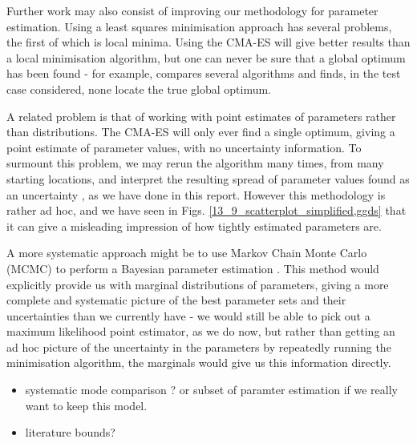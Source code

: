 \documentclass[10pt,journal]{./IEEE_latex_class/IEEEtran}
\begin{document}
Further work may also consist of improving our methodology for parameter estimation. Using a least squares minimisation approach has several problems, the first of which is local minima. Using the CMA-ES will give better results than a local minimisation algorithm, but one can never be sure that a global optimum has been found - for example, \cite{Algorithms2003} compares several algorithms and finds, in the test case considered, none locate the true global optimum.

 A related problem is that of working with point estimates of parameters rather than distributions. The CMA-ES will only ever find a single optimum, giving a point estimate of parameter values, with no uncertainty information. To surmount this problem, we may rerun the algorithm many times, from many starting locations, and interpret the resulting spread of parameter values found as an uncertainty \cite{Hu2015}, as we have done in this report. However this methodology is rather ad hoc, and we have seen in Figs. \ref{13_9_scatterplot_simplified,ggds} that it can give a misleading impression of how tightly estimated parameters are.






A more systematic approach might be to use Markov Chain Monte Carlo (MCMC) to perform a Bayesian parameter estimation \cite{Jitjareonchai2006,Andrieu2003}. This method would explicitly provide us with marginal distributions of parameters, giving a more complete and systematic picture of the best parameter sets and their uncertainties than we currently have - we would still be able to pick out a maximum likelihood point estimator, as we do now, but rather than getting an ad hoc picture of the uncertainty in the parameters by repeatedly running the minimisation algorithm, the marginals would give us this information directly.

\begin{itemize}
\item systematic mode comparison ? or subset of paramter estimation if we really want to keep this model.
\item literature bounds?
\end{itemize}

\begin{footnotesize}


\end{footnotesize}
\clearpage
\onecolumn
\end{document}
